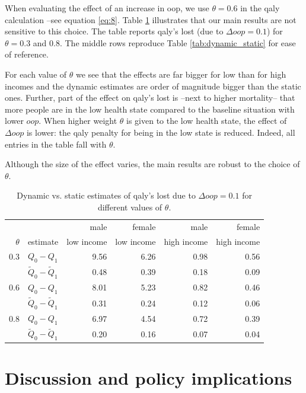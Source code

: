 \documentclass[a4paper,12pt]{article}
\begin{document}
When evaluating the effect of an increase in oop, we use \(\theta=0.6\) in the qaly calculation --see equation \eqref{eq:8}. Table \ref{tab:dynamic_static_theta} illustrates that our main results are not sensitive to this choice. The table reports qaly's lost (due to \(\Delta oop =0.1\)) for \(\theta=0.3\) and \(0.8\). The middle rows reproduce Table \ref{tab:dynamic_static} for ease of reference.

For each value of \(\theta\) we see that the effects are far bigger for low than for high incomes and the dynamic estimates are order of magnitude bigger than the static ones. Further, part of the effect on qaly's lost is --next to higher mortality-- that more people are in the low health state compared to the baseline situation with lower \(oop\). When higher weight \(\theta\) is given to the low health state, the effect of \(\Delta oop\) is lower: the qaly penalty for being in the low state is reduced. Indeed, all entries in the table fall with \(\theta\).

Although the size of the effect varies, the main results are robust to the choice of \(\theta\).

\begin{table}[htbp]
\caption{\label{tab:dynamic_static_theta}Dynamic vs. static estimates of qaly's lost due to \(\Delta oop = 0.1\) for different values of \(\theta\).}
\centering
\begin{tabular}{rlrrrr}
 &  & male & female & male & female\\
\(\theta\) & estimate & low income & low income & high income & high income\\
\hline
0.3 & \(Q_0 - Q_1\) & 9.56 & 6.26 & 0.98 & 0.56\\
 & \(\tilde Q_0 - \tilde Q_1\) & 0.48 & 0.39 & 0.18 & 0.09\\
0.6 & \(Q_0 - Q_1\) & 8.01 & 5.23 & 0.82 & 0.46\\
 & \(\tilde Q_0 - \tilde Q_1\) & 0.31 & 0.24 & 0.12 & 0.06\\
0.8 & \(Q_0 - Q_1\) & 6.97 & 4.54 & 0.72 & 0.39\\
 & \(\tilde Q_0 - \tilde Q_1\) & 0.20 & 0.16 & 0.07 & 0.04\\
\end{tabular}
\end{table}
\section{Discussion and policy implications}
\label{sec:orgcbc43f1}
\end{document}
